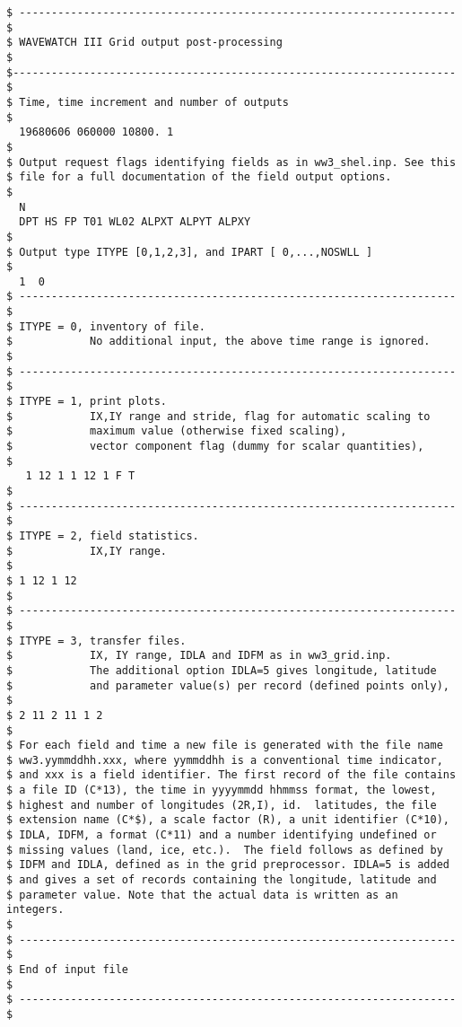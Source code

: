 \begin{footnotesize}
\begin{verbatim}
$ -------------------------------------------------------------------- $
$ WAVEWATCH III Grid output post-processing                            $
$--------------------------------------------------------------------- $
$ Time, time increment and number of outputs
$
  19680606 060000 10800. 1
$
$ Output request flags identifying fields as in ww3_shel.inp. See this
$ file for a full documentation of the field output options.
$
  N
  DPT HS FP T01 WL02 ALPXT ALPYT ALPXY
$
$ Output type ITYPE [0,1,2,3], and IPART [ 0,...,NOSWLL ]
$
  1  0
$ -------------------------------------------------------------------- $
$ ITYPE = 0, inventory of file.
$            No additional input, the above time range is ignored.
$
$ -------------------------------------------------------------------- $
$ ITYPE = 1, print plots.
$            IX,IY range and stride, flag for automatic scaling to
$            maximum value (otherwise fixed scaling),
$            vector component flag (dummy for scalar quantities),
$
   1 12 1 1 12 1 F T
$
$ -------------------------------------------------------------------- $
$ ITYPE = 2, field statistics.
$            IX,IY range.
$
$ 1 12 1 12
$
$ -------------------------------------------------------------------- $
$ ITYPE = 3, transfer files.
$            IX, IY range, IDLA and IDFM as in ww3_grid.inp.
$            The additional option IDLA=5 gives longitude, latitude 
$            and parameter value(s) per record (defined points only),
$
$ 2 11 2 11 1 2
$
$ For each field and time a new file is generated with the file name
$ ww3.yymmddhh.xxx, where yymmddhh is a conventional time indicator,
$ and xxx is a field identifier. The first record of the file contains
$ a file ID (C*13), the time in yyyymmdd hhmmss format, the lowest,
$ highest and number of longitudes (2R,I), id.  latitudes, the file
$ extension name (C*$), a scale factor (R), a unit identifier (C*10),
$ IDLA, IDFM, a format (C*11) and a number identifying undefined or
$ missing values (land, ice, etc.).  The field follows as defined by
$ IDFM and IDLA, defined as in the grid preprocessor. IDLA=5 is added
$ and gives a set of records containing the longitude, latitude and
$ parameter value. Note that the actual data is written as an integers.
$
$ -------------------------------------------------------------------- $
$ End of input file                                                    $
$ -------------------------------------------------------------------- $
\end{verbatim}
\end{footnotesize}
